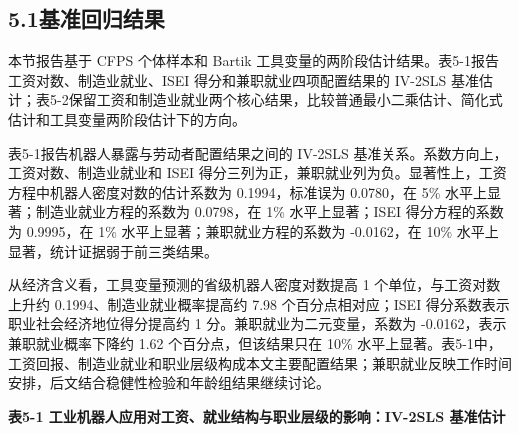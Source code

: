 \subsection{5.1基准回归结果}\label{ux57faux51c6ux56deux5f52ux7ed3ux679c}

本节报告基于 CFPS 个体样本和 Bartik 工具变量的两阶段估计结果。表5-1报告工资对数、制造业就业、ISEI 得分和兼职就业四项配置结果的 IV-2SLS 基准估计；表5-2保留工资和制造业就业两个核心结果，比较普通最小二乘估计、简化式估计和工具变量两阶段估计下的方向。

表5-1报告机器人暴露与劳动者配置结果之间的 IV-2SLS 基准关系。系数方向上，工资对数、制造业就业和 ISEI 得分三列为正，兼职就业列为负。显著性上，工资方程中机器人密度对数的估计系数为 0.1994，标准误为 0.0780，在 5\% 水平上显著；制造业就业方程的系数为 0.0798，在 1\% 水平上显著；ISEI 得分方程的系数为 0.9995，在 1\% 水平上显著；兼职就业方程的系数为 -0.0162，在 10\% 水平上显著，统计证据弱于前三类结果。

从经济含义看，工具变量预测的省级机器人密度对数提高 1 个单位，与工资对数上升约 0.1994、制造业就业概率提高约 7.98 个百分点相对应；ISEI 得分系数表示职业社会经济地位得分提高约 1 分。兼职就业为二元变量，系数为 -0.0162，表示兼职就业概率下降约 1.62 个百分点，但该结果只在 10\% 水平上显著。表5-1中，工资回报、制造业就业和职业层级构成本文主要配置结果；兼职就业反映工作时间安排，后文结合稳健性检验和年龄组结果继续讨论。

\textbf{表5-1 工业机器人应用对工资、就业结构与职业层级的影响：IV-2SLS 基准估计}

